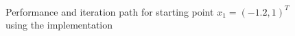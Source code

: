 \begin{figure}
    \mbox{ \quad {}}
    \caption{Performance and iteration path for starting point $x_1=(-1.2, 1)^T$ using the  implementation}
    \label{fig:convergence-start1-my-impl}
\end{figure}
